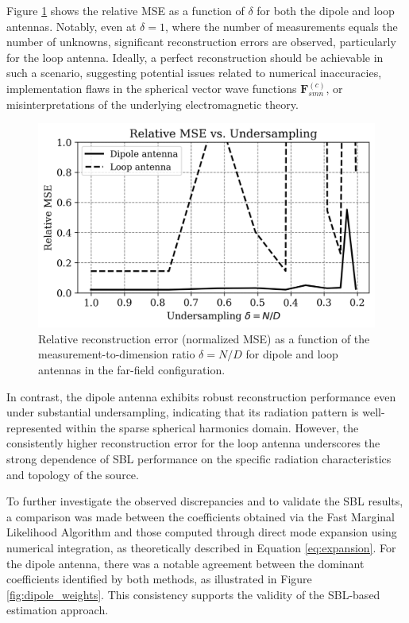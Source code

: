 \documentclass{article}
\begin{document}
Figure \ref{fig:mse_ff} shows the relative MSE as a function of $\delta$ for both the dipole and loop antennas. Notably, even at $\delta=1$, where the number of measurements equals the number of unknowns, significant reconstruction errors are observed, particularly for the loop antenna. Ideally, a perfect reconstruction should be achievable in such a scenario, suggesting potential issues related to numerical inaccuracies, implementation flaws in the spherical vector wave functions $\mathbf{F}_{smn}^{(c)}$, or misinterpretations of the underlying electromagnetic theory.
\begin{figure}[H]
    \centering
    \includegraphics[width=0.75\linewidth]{Figures/delta_vs_mse_ff.png}
    \caption{Relative reconstruction error (normalized MSE) as a function of the measurement-to-dimension ratio $\delta = N/D$ for dipole and loop antennas in the far-field configuration.}
    \label{fig:mse_ff}
\end{figure}

In contrast, the dipole antenna exhibits robust reconstruction performance even under substantial undersampling, indicating that its radiation pattern is well-represented within the sparse spherical harmonics domain. However, the consistently higher reconstruction error for the loop antenna underscores the strong dependence of SBL performance on the specific radiation characteristics and topology of the source.

To further investigate the observed discrepancies and to validate the SBL results, a comparison was made between the coefficients obtained via the Fast Marginal Likelihood Algorithm and those computed through direct mode expansion using numerical integration, as theoretically described in Equation \ref{eq:expansion}. For the dipole antenna, there was a notable agreement between the dominant coefficients identified by both methods, as illustrated in Figure \ref{fig:dipole_weights}. This consistency supports the validity of the SBL-based estimation approach.
\end{document}
